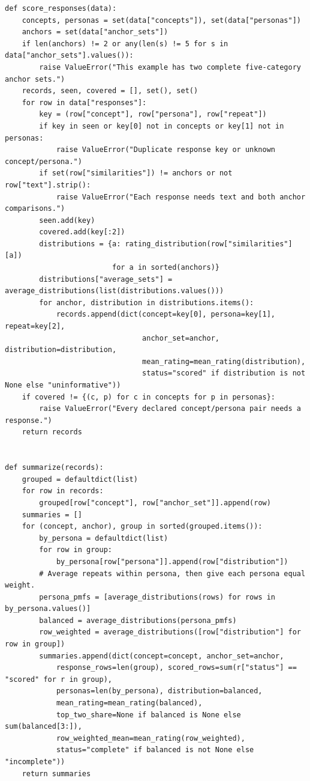 \begin{Verbatim}[breaklines,breakanywhere,fontsize=\small]
def score_responses(data):
    concepts, personas = set(data["concepts"]), set(data["personas"])
    anchors = set(data["anchor_sets"])
    if len(anchors) != 2 or any(len(s) != 5 for s in data["anchor_sets"].values()):
        raise ValueError("This example has two complete five-category anchor sets.")
    records, seen, covered = [], set(), set()
    for row in data["responses"]:
        key = (row["concept"], row["persona"], row["repeat"])
        if key in seen or key[0] not in concepts or key[1] not in personas:
            raise ValueError("Duplicate response key or unknown concept/persona.")
        if set(row["similarities"]) != anchors or not row["text"].strip():
            raise ValueError("Each response needs text and both anchor comparisons.")
        seen.add(key)
        covered.add(key[:2])
        distributions = {a: rating_distribution(row["similarities"][a])
                         for a in sorted(anchors)}
        distributions["average_sets"] = average_distributions(list(distributions.values()))
        for anchor, distribution in distributions.items():
            records.append(dict(concept=key[0], persona=key[1], repeat=key[2],
                                anchor_set=anchor, distribution=distribution,
                                mean_rating=mean_rating(distribution),
                                status="scored" if distribution is not None else "uninformative"))
    if covered != {(c, p) for c in concepts for p in personas}:
        raise ValueError("Every declared concept/persona pair needs a response.")
    return records


def summarize(records):
    grouped = defaultdict(list)
    for row in records:
        grouped[row["concept"], row["anchor_set"]].append(row)
    summaries = []
    for (concept, anchor), group in sorted(grouped.items()):
        by_persona = defaultdict(list)
        for row in group:
            by_persona[row["persona"]].append(row["distribution"])
        # Average repeats within persona, then give each persona equal weight.
        persona_pmfs = [average_distributions(rows) for rows in by_persona.values()]
        balanced = average_distributions(persona_pmfs)
        row_weighted = average_distributions([row["distribution"] for row in group])
        summaries.append(dict(concept=concept, anchor_set=anchor,
            response_rows=len(group), scored_rows=sum(r["status"] == "scored" for r in group),
            personas=len(by_persona), distribution=balanced,
            mean_rating=mean_rating(balanced),
            top_two_share=None if balanced is None else sum(balanced[3:]),
            row_weighted_mean=mean_rating(row_weighted),
            status="complete" if balanced is not None else "incomplete"))
    return summaries



\end{Verbatim}
